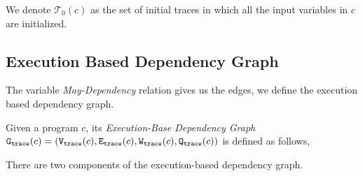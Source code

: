 %
We denote $\mathcal{T}_0(c)$ as the set of initial traces in which all the input variables in $c$ are initialized.
%
\subsection{Execution Based Dependency Graph}
\label{sec:execution-base-graph-def}
%
%
%
%
The variable \emph{May-Dependency} relation gives us the edges, we define the execution based dependency graph.
\begin{defn}
\label{def:trace_graph}
Given a program ${c}$,
its \emph{Execution-Base Dependency Graph} 
$\mathtt{{G_{trace}}}({c}) = (\mathtt{{V_{trace}}}({c}), \mathtt{{E_{trace}}}({c}), \mathtt{{W_{trace}}}({c}), \mathtt{{Q_{trace}}}({c}))$ is defined as follows,
%
\highlight{\small
\[
\begin{array}{rlcl}
  \text{Vertices} &
  \traceV({c}) & := & 
  \{ 
  (x^l, w) 
  ~ \vert ~ 
  w : \mathcal{T} \to \mathbb{N}
  \land
  x^l \in \lvar(c) 
  \\ & & &
  \land
  \forall \trace \in \mathcal{T}_0(c), \trace' \in \mathcal{T} \st \config{{c}, \trace} \to^{*} \config{\eskip, \trace\tracecat\vtrace'} 
  \implies w(\trace) = \vcounter(\vtrace', l) 
\}
  \\
  \text{Edges} &
  \traceE({c}) & := & 
  \{ 
  (x^i, w, y^j) 
  ~ \vert ~
  x^i, y^j \in \lvar(c)
  \land w \in \mathcal{P}( \mathcal{T} \to \mathbb{N})
  \land 
  \exists \trace \in \mathcal{T}_0(c), 
  \trace_1, \trace_2 \in \mathcal{T} \st \dep(x^i, y^j,\trace_1, \trace_2, \trace_0, c)
  \\ & & &
  \forall \trace_0 \in \mathcal{T}_0(c) \st
  w (\trace_0) = \max\{|\sdiff(\trace_1, \trace_2, y)|
  \forall \trace_1, \trace_2 \in \mathcal{T} \st \dep(x^i, y^j,\trace_1, \trace_2, \trace_0, c) \}
  \}
\end{array}.
\]
}
\end{defn}
There are two components of the execution-based dependency graph. 
